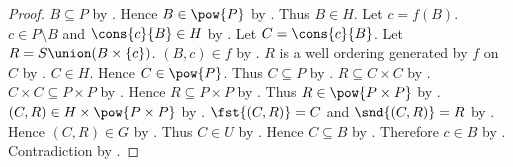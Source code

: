 \begin{proof}
    $B\subseteq P$ by .
    Hence $B\in\pow{P}$ by .
    Thus $B\in H$.
    Let $c=f(B)$.
    $c\in P\setminus B$ and $\cons{c}{B}\in H$ by \auto.
    Let $C=\cons{c}{B}$.
    Let $R=S\union(B\times\{c\})$.
    $(B,c)\in f$ by .
    $R$ is a well ordering generated by $f$ on $C$
        by .
    $C\in H$.
    Hence $C\in\pow{P}$.
    Thus $C\subseteq P$ by .
    $R\subseteq C\times C$ by .
    $C\times C\subseteq P\times P$
        by .
    Hence $R\subseteq P\times P$ by .
    Thus $R\in\pow{P\times P}$ by .
    $(C,R)\in H\times\pow{P\times P}$ by .
    $\fst{(C,R)}=C$ and $\snd{(C,R)}=R$ by .
    Hence $(C,R)\in G$ by \auto.
    Thus $C\in U$ by \auto.
    Hence $C\subseteq B$ by .
    Therefore $c\in B$ by .
    Contradiction by .
\end{proof}
